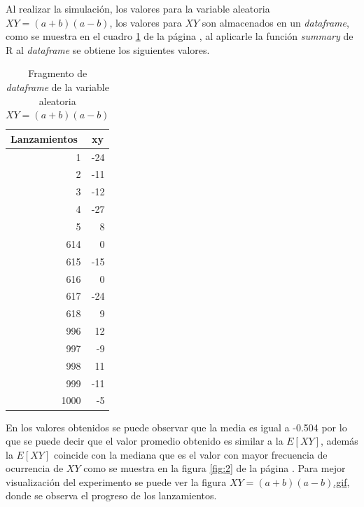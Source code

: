 \documentclass{article}
\begin{document}
Al realizar la simulación, los valores para la variable aleatoria $XY =(a+b)(a-b)$, los valores para $XY$ son almacenados en un \textit{dataframe}, como se muestra en el cuadro \ref{tab:m} de la página \pageref{tab:m}, al aplicarle la función \textit{summary} de R al \textit{dataframe} se obtiene los siguientes valores.  
\begin{table}[H]
  \centering
  \caption{Fragmento de \textit{dataframe} de la variable aleatoria $XY = (a+b)(a-b)$ }
    \begin{tabular}{rr}
    \toprule
    \multicolumn{1}{l}{Lanzamientos} & \multicolumn{1}{c}{xy} \\
    \midrule
    1     & -24 \\
    2     & -11 \\
    3     & -12 \\
    4     & -27 \\
    5     & 8 \\
    614   & 0 \\
    615   & -15 \\
    616   & 0 \\
    617   & -24 \\
    618   & 9 \\
    996   & 12 \\
    997   & -9 \\
    998   & 11 \\
    999   & -11 \\
    1000  & -5 \\
    \bottomrule
    \end{tabular}%
  \label{tab:m}%
\end{table}%

En los valores obtenidos se puede observar que la media es igual a -0.504 por lo que se puede decir que el valor promedio obtenido es similar a la $E[XY]$, además la $E[XY]$ coincide con la mediana que es el valor con mayor frecuencia de ocurrencia de $XY$ como se muestra en la figura \ref{fig:2} de la página \pageref{fig:2}. Para mejor visualización del experimento se puede ver la figura  \href{https://github.com/Albertomnoa/Tareas_MPA/blob/master/Tarea10/gif/multipli.gif}{$XY = (a+b)(a-b)$.gif}, donde se observa el progreso de los lanzamientos.
\end{document}

